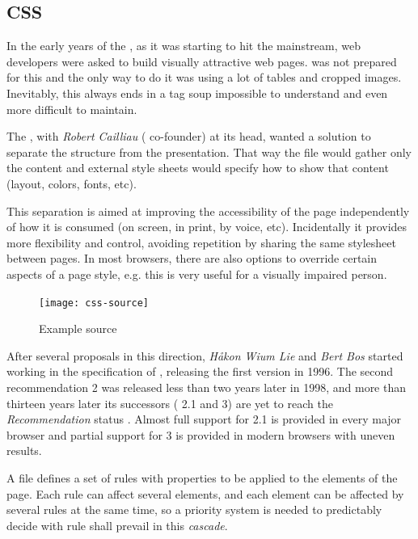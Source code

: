 \subsection{CSS} %
\label{sub:css}

In the early years of the , as it was starting to hit the mainstream, web developers were asked to build visually attractive web pages.
 was not prepared for this and the only way to do it was using a lot of tables and cropped images.
Inevitably, this always ends in a tag soup impossible to understand and even more difficult to maintain.

The , with \emph{Robert Cailliau} ( co-founder) at its head, wanted a solution to separate the structure from the presentation.
That way the  file would gather only the content and external style sheets would specify how to show that content (layout, colors, fonts, etc).

This separation is aimed at improving the accessibility of the page independently of how it is consumed (on screen, in print, by voice, etc).
Incidentally it provides more flexibility and control, avoiding repetition by sharing the same stylesheet between pages.
In most browsers, there are also options to override certain aspects of a page style, e.g. this is very useful for a visually impaired person.

\begin{figure}
  \centering
    \texttt{[image: css-source]}
  \caption{Example  source}
  \label{fig:css-source}
\end{figure}

After several proposals in this direction, \emph{Håkon Wium Lie} and \emph{Bert Bos} started working in the specification of , releasing the first version in 1996.
The second recommendation  2 was released less than two years later in 1998, and more than thirteen years later its successors ( 2.1  \cite{CSS2} and  3) are yet to reach the \emph{Recommendation} status \cite{CSS}.
Almost full support for  2.1 is provided in every major browser and partial support for  3 is provided in modern browsers with uneven results.

A  file defines a set of rules with properties to be applied to the elements of the page.
Each rule can affect several elements, and each element can be affected by several rules at the same time, so a priority system is needed to predictably decide with rule shall prevail in this \emph{cascade}.

